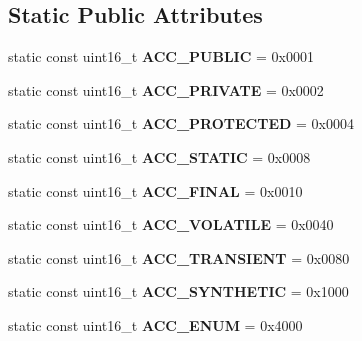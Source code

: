 \subsection*{Static Public Attributes}
\begin{DoxyCompactItemize}
\item 
static const uint16\+\_\+t {\bfseries A\+C\+C\+\_\+\+P\+U\+B\+L\+IC} = 0x0001\hypertarget{classFieldInfo_a75f5363e21c20fc65a93fc11a9aabcd3}{}\label{classFieldInfo_a75f5363e21c20fc65a93fc11a9aabcd3}

\item 
static const uint16\+\_\+t {\bfseries A\+C\+C\+\_\+\+P\+R\+I\+V\+A\+TE} = 0x0002\hypertarget{classFieldInfo_a693cbb85341c9b61b710f56f89d56442}{}\label{classFieldInfo_a693cbb85341c9b61b710f56f89d56442}

\item 
static const uint16\+\_\+t {\bfseries A\+C\+C\+\_\+\+P\+R\+O\+T\+E\+C\+T\+ED} = 0x0004\hypertarget{classFieldInfo_ac9df52613f502a46611a670d07715d74}{}\label{classFieldInfo_ac9df52613f502a46611a670d07715d74}

\item 
static const uint16\+\_\+t {\bfseries A\+C\+C\+\_\+\+S\+T\+A\+T\+IC} = 0x0008\hypertarget{classFieldInfo_a9358cd6a36145926bedbd8718c0118c5}{}\label{classFieldInfo_a9358cd6a36145926bedbd8718c0118c5}

\item 
static const uint16\+\_\+t {\bfseries A\+C\+C\+\_\+\+F\+I\+N\+AL} = 0x0010\hypertarget{classFieldInfo_a75c707ef25ffeac2c597fb4b263d7f0c}{}\label{classFieldInfo_a75c707ef25ffeac2c597fb4b263d7f0c}

\item 
static const uint16\+\_\+t {\bfseries A\+C\+C\+\_\+\+V\+O\+L\+A\+T\+I\+LE} = 0x0040\hypertarget{classFieldInfo_abfd881c22b6614454d43b694f7917a5b}{}\label{classFieldInfo_abfd881c22b6614454d43b694f7917a5b}

\item 
static const uint16\+\_\+t {\bfseries A\+C\+C\+\_\+\+T\+R\+A\+N\+S\+I\+E\+NT} = 0x0080\hypertarget{classFieldInfo_ab92e26f398d22b736caeb5b2cad1ad31}{}\label{classFieldInfo_ab92e26f398d22b736caeb5b2cad1ad31}

\item 
static const uint16\+\_\+t {\bfseries A\+C\+C\+\_\+\+S\+Y\+N\+T\+H\+E\+T\+IC} = 0x1000\hypertarget{classFieldInfo_ab29855bcd32f7626b25f8dbcbc0e9475}{}\label{classFieldInfo_ab29855bcd32f7626b25f8dbcbc0e9475}

\item 
static const uint16\+\_\+t {\bfseries A\+C\+C\+\_\+\+E\+N\+UM} = 0x4000\hypertarget{classFieldInfo_a91b395ce72803737a57c79ba5aa3640f}{}\label{classFieldInfo_a91b395ce72803737a57c79ba5aa3640f}

\end{DoxyCompactItemize}


